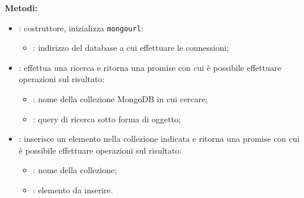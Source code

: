 \textbf{Metodi:}
\begin{itemize}
	\item {}: costruttore, inizializza \texttt{mongourl}:	
	\begin{itemize}
		\item {}: indirizzo del database a cui effettuare le connessioni;
	\end{itemize}
	\item {}: effettua una ricerca e ritorna una promise con cui è possibile effettuare operazioni sul risultato:
	\begin{itemize}
		\item {}: nome della collezione MongoDB in cui cercare;
		\item {}: query di ricerca sotto forma di oggetto;
	\end{itemize}
	\item {}: inserisce un elemento nella collezione indicata e ritorna una promise con cui è possibile effettuare operazioni sul risultato:
	\begin{itemize}
		\item {}: nome della collezione;
		\item {}: elemento da inserire.
	\end{itemize}
\end{itemize}





%
%

